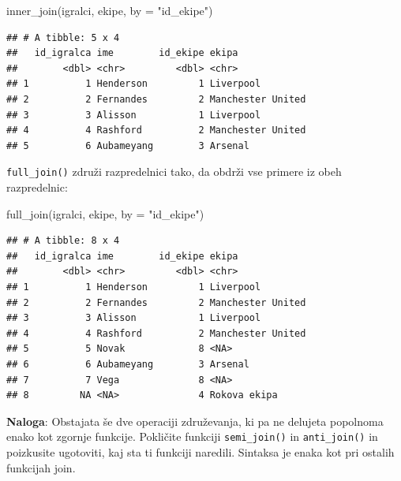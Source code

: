 \documentclass[
]{book}
\newenvironment{Shaded}{\begin{snugshade}}{\end{snugshade}}
\newcommand{\AttributeTok}[1]{\textcolor[rgb]{0.77,0.63,0.00}{#1}}
\newcommand{\FunctionTok}[1]{\textcolor[rgb]{0.00,0.00,0.00}{#1}}
\newcommand{\NormalTok}[1]{#1}
\newcommand{\StringTok}[1]{\textcolor[rgb]{0.31,0.60,0.02}{#1}}
\begin{document}
\begin{Shaded}
\begin{Highlighting}[]
\FunctionTok{inner\_join}\NormalTok{(igralci, ekipe, }\AttributeTok{by =} \StringTok{"id\_ekipe"}\NormalTok{)}
\end{Highlighting}
\end{Shaded}

\begin{verbatim}
## # A tibble: 5 x 4
##   id_igralca ime        id_ekipe ekipa            
##        <dbl> <chr>         <dbl> <chr>            
## 1          1 Henderson         1 Liverpool        
## 2          2 Fernandes         2 Manchester United
## 3          3 Alisson           1 Liverpool        
## 4          4 Rashford          2 Manchester United
## 5          6 Aubameyang        3 Arsenal
\end{verbatim}

\texttt{full\_join()} združi razpredelnici tako, da obdrži vse primere iz obeh razpredelnic:

\begin{Shaded}
\begin{Highlighting}[]
\FunctionTok{full\_join}\NormalTok{(igralci, ekipe, }\AttributeTok{by =} \StringTok{"id\_ekipe"}\NormalTok{)}
\end{Highlighting}
\end{Shaded}

\begin{verbatim}
## # A tibble: 8 x 4
##   id_igralca ime        id_ekipe ekipa            
##        <dbl> <chr>         <dbl> <chr>            
## 1          1 Henderson         1 Liverpool        
## 2          2 Fernandes         2 Manchester United
## 3          3 Alisson           1 Liverpool        
## 4          4 Rashford          2 Manchester United
## 5          5 Novak             8 <NA>             
## 6          6 Aubameyang        3 Arsenal          
## 7          7 Vega              8 <NA>             
## 8         NA <NA>              4 Rokova ekipa
\end{verbatim}

\textbf{Naloga}: Obstajata še dve operaciji združevanja, ki pa ne delujeta popolnoma enako kot zgornje funkcije. Pokličite funkciji \texttt{semi\_join()} in \texttt{anti\_join()} in poizkusite ugotoviti, kaj sta ti funkciji naredili. Sintaksa je enaka kot pri ostalih funkcijah join.
\end{document}
